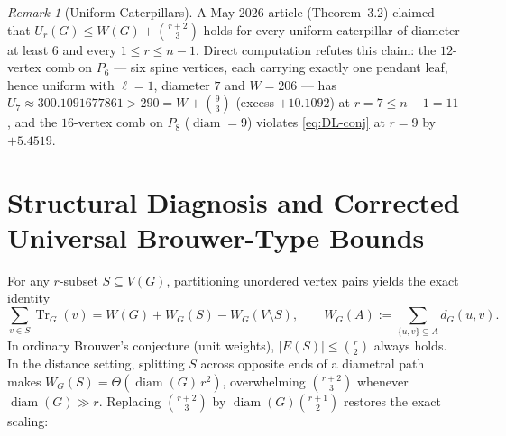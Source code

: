 \documentclass[11pt,a4paper]{article}
\theoremstyle{remark}
\newtheorem{remark}[theorem]{Remark}
\DeclareMathOperator{\Tr}{Tr}
\DeclareMathOperator{\diam}{diam}
\begin{document}
\begin{remark}[Uniform Caterpillars]\label{rem:caterpillar}
A May 2026 article \cite{Caterpillar2026} (Theorem~3.2) claimed that $U_r(G) \le W(G)+\binom{r+2}{3}$ holds for every uniform caterpillar of diameter at least $6$ and every $1 \le r \le n-1$. Direct computation refutes this claim: the $12$-vertex comb on $P_6$ --- six spine vertices, each carrying exactly one pendant leaf, hence uniform with $\ell=1$, diameter $7$ and $W=206$ --- has $U_7 \approx 300.1091677861 > 290 = W + \binom{9}{3}$ (excess $+10.1092$) at $r=7 \le n-1 = 11$, and the $16$-vertex comb on $P_8$ ($\diam=9$) violates \eqref{eq:DL-conj} at $r=9$ by $+5.4519$.
\end{remark}

\section{Structural Diagnosis and Corrected Universal Brouwer-Type Bounds}
For any $r$-subset $S \subseteq V(G)$, partitioning unordered vertex pairs yields the exact identity
\[
\sum_{v \in S} \Tr_G(v) = W(G) + W_G(S) - W_G(V \setminus S),
\qquad W_G(A) := \sum_{\{u,v\}\subseteq A} d_G(u,v).
\]
In ordinary Brouwer's conjecture (unit weights), $|E(S)| \le \binom{r}{2}$ always holds. In the distance setting, splitting $S$ across opposite ends of a diametral path makes $W_G(S) = \Theta(\diam(G)\,r^2)$, overwhelming $\binom{r+2}{3}$ whenever $\diam(G) \gg r$. Replacing $\binom{r+2}{3}$ by $\diam(G)\binom{r+1}{2}$ restores the exact scaling:
\end{document}
